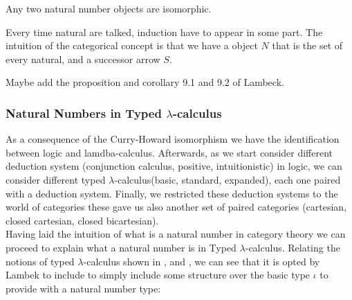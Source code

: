 \begin{proposition}
  Any two natural number objects are isomorphic.
\end{proposition}

Every time natural are talked, induction have to appear in some part. The intuition of the categorical concept is that we have a object $N$ that is the set of every natural, and a successor arrow $S$. 

{\color{red} Maybe add the proposition and corollary 9.1 and 9.2 of Lambeck.}


\subsubsection{Natural Numbers in Typed $\lambda$-calculus}\label{section:natural-revisited}

As a consequence of the Curry-Howard isomorphism we have the identification between logic and lamdba-calculus. Afterwards, as we start consider different deduction system  (conjunction calculus, positive, intuitionistic) in logic, we can consider different typed $\lambda$-calculus(basic, standard, expanded), each one paired with a deduction system. Finally, we restricted these deduction systems to the world of categories these gave us also another set of paired categories (cartesian, closed cartesian, closed bicartesian).\\

Having laid the intuition of what is a natural number in category theory we can proceed to explain what a natural number is in Typed $\lambda$-calculus. Relating the notions of typed $\lambda$-calculus shown in \cite[Section 10]{lambek1988introduction}, \cite[Section 6]{selinger2008lecture} and \cite[Section 10]{cardone2006history}, we can see that it is opted by Lambek to include to simply include some structure over the basic type $\iota$ to provide with a natural number type:

